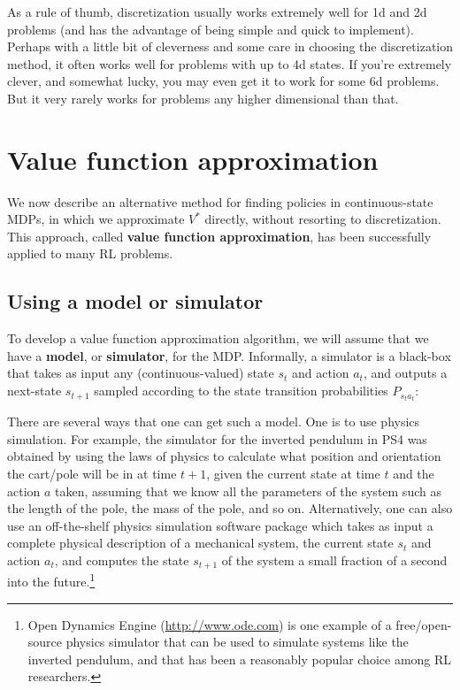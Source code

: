 As a rule of thumb, discretization usually works extremely well for 1d
and 2d problems (and has the advantage of being simple and quick to
implement). Perhaps with a little bit of cleverness and some care in choosing
the discretization method, it often works well for problems with up to 4d
states. If you're extremely clever, and somewhat lucky, you may even get it
to work for some 6d problems. But it very rarely works for problems any
higher dimensional than that.

\section{Value function approximation}
We now describe an alternative method for finding policies in continuous-state
MDPs, in which we approximate $V^*$ directly, without resorting to
discretization. This approach, called \textbf{value function approximation}, has been
successfully applied to many RL problems.

\subsection{Using a model or simulator}
To develop a value function approximation algorithm, we will assume that
we have a \textbf{model}, or \textbf{simulator}, for the MDP. Informally, a simulator is
a black-box that takes as input any (continuous-valued) state $s_t$ and action
$a_t$, and outputs a next-state $s_{t+1}$ sampled according to the state transition
probabilities $P_{s_t a_t}$:

There are several ways that one can get such a model. One is to use
physics simulation. For example, the simulator for the inverted pendulum
in PS4 was obtained by using the laws of physics to calculate what position
and orientation the cart/pole will be in at time $t+1$, given the current state
at time $t$ and the action $a$ taken, assuming that we know all the parameters
of the system such as the length of the pole, the mass of the pole, and so
on. Alternatively, one can also use an off-the-shelf physics simulation software
package which takes as input a complete physical description of a mechanical
system, the current state $s_t$ and action $a_t$, and computes the state $s_{t+1}$ of the
system a small fraction of a second into the future.\footnote{
Open Dynamics Engine (\url{http://www.ode.com}) is one example of a free/open-source
physics simulator that can be used to simulate systems like the inverted pendulum, and
that has been a reasonably popular choice among RL researchers.}

